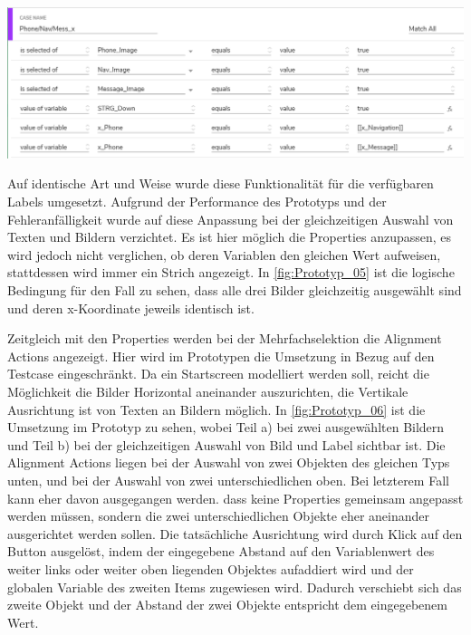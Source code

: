 \begin{center}
  \includegraphics[scale=0.6]{figures/Prototyp_05.PNG}
  \label{fig:Prototyp_05}
\end{center}

Auf identische Art und Weise wurde diese Funktionalität für die verfügbaren Labels umgesetzt.
Aufgrund der Performance des Prototyps und der Fehleranfälligkeit wurde auf diese Anpassung bei der gleichzeitigen Auswahl von Texten und Bildern verzichtet.
Es ist hier möglich die Properties anzupassen, es wird jedoch nicht verglichen, ob deren Variablen den gleichen Wert aufweisen, stattdessen wird immer ein Strich angezeigt.
In \cref{fig:Prototyp_05} ist die logische Bedingung für den Fall zu sehen, dass alle drei Bilder gleichzeitig ausgewählt sind und deren x-Koordinate jeweils identisch ist.

Zeitgleich mit den Properties werden bei der Mehrfachselektion die Alignment Actions angezeigt.
Hier wird im Prototypen die Umsetzung in Bezug auf den Testcase eingeschränkt.
Da ein Startscreen modelliert werden soll, reicht die Möglichkeit die Bilder Horizontal aneinander auszurichten, die Vertikale Ausrichtung ist von Texten an Bildern möglich.
In \cref{fig:Prototyp_06} ist die Umsetzung im Prototyp zu sehen, wobei Teil a) bei zwei ausgewählten Bildern und Teil b) bei der gleichzeitigen Auswahl von Bild und Label sichtbar ist.
Die Alignment Actions liegen bei der Auswahl von zwei Objekten des gleichen Typs unten, und bei der Auswahl von zwei unterschiedlichen oben.
Bei letzterem Fall kann eher davon ausgegangen werden. dass keine Properties gemeinsam angepasst werden müssen, sondern die zwei unterschiedlichen Objekte eher aneinander ausgerichtet werden sollen.
Die tatsächliche Ausrichtung wird durch Klick auf den Button ausgelöst, indem der eingegebene Abstand auf den Variablenwert des weiter links oder weiter oben liegenden Objektes aufaddiert wird und der globalen Variable des zweiten Items zugewiesen wird.
Dadurch verschiebt sich das zweite Objekt und der Abstand der zwei Objekte entspricht dem eingegebenem Wert.

